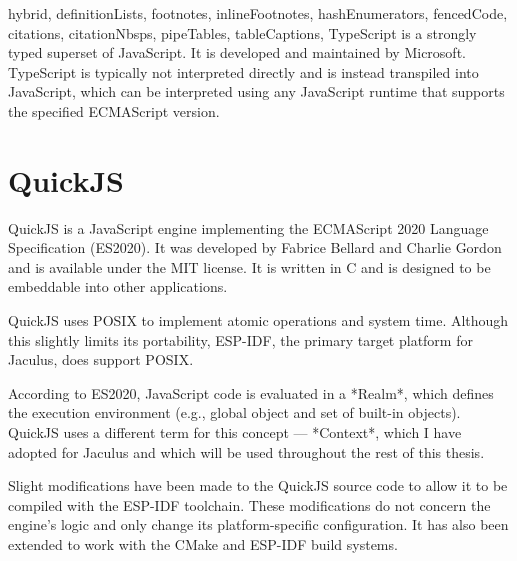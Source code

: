 \begin{markdown*}{%
  hybrid,
  definitionLists,
  footnotes,
  inlineFootnotes,
  hashEnumerators,
  fencedCode,
  citations,
  citationNbsps,
  pipeTables,
  tableCaptions,
}
TypeScript is a strongly typed superset of JavaScript. It is developed and maintained by Microsoft. TypeScript is typically not interpreted directly and is instead transpiled into JavaScript, which can be interpreted using any JavaScript runtime that supports the specified ECMAScript version.

\section{QuickJS}

QuickJS is a JavaScript engine implementing the ECMAScript 2020 Language Specification\cite{es2020} (ES2020). It was developed by Fabrice Bellard and Charlie Gordon and is available under the MIT license. It is written in C and is designed to be embeddable into other applications.

QuickJS uses POSIX to implement atomic operations and system time. Although this slightly limits its portability, ESP-IDF, the primary target platform for Jaculus, does support POSIX.

According to ES2020, JavaScript code is evaluated in a *Realm*, which defines the execution environment (e.g., global object and set of built-in objects). QuickJS uses a different term for this concept --- *Context*, which I have adopted for Jaculus and which will be used throughout the rest of this thesis.

Slight modifications have been made to the QuickJS source code to allow it to be compiled with the ESP-IDF toolchain. These modifications do not concern the engine's logic and only change its platform-specific configuration. It has also been extended to work with the CMake and ESP-IDF build systems.


\end{markdown*}
